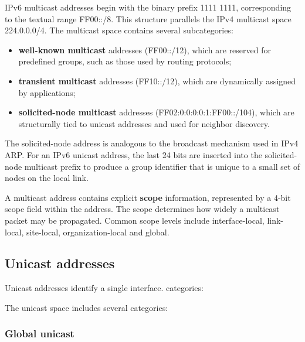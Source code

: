 IPv6 multicast addresses begin with the binary prefix 1111 1111, corresponding to the textual range FF00::/8. This structure parallels the IPv4 multicast space 224.0.0.0/4. The multicast space contains several subcategories:

\begin{itemize}
\item \textbf{well-known multicast} addresses (FF00::/12), which are reserved for predefined groups, such as those used by routing protocols;
\item \textbf{transient multicast} addresses (FF10::/12), which are dynamically assigned by applications;
\item \textbf{solicited-node multicast} addresses (FF02:0:0:0:0:1:FF00::/104), which are structurally tied to unicast addresses and used for neighbor discovery.
\end{itemize}

The solicited-node address is analogous to the broadcast mechanism used in IPv4 ARP. For an IPv6 unicast address, the last 24 bits are inserted into the solicited-node multicast prefix to produce a group identifier that is unique to a small set of nodes on the local link.

A multicast address contains explicit \textbf{scope} information, represented by a 4-bit scope field within the address. The scope determines how widely a multicast packet may be propagated. Common scope levels include interface-local, link-local, site-local, organization-local and global.

\begin{center}
\end{center}

\begin{center}
\end{center}

\subsection{Unicast addresses}

Unicast addresses identify a single interface. categories:

The unicast space includes several categories:

\subsubsection*{Global unicast}

